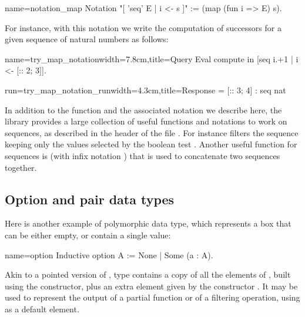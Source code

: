\begin{coq}{name=notation_map}{}
Notation "[ 'seq' E | i <- s ]" := (map (fun i => E) s).
\end{coq}
For instance, with this notation we write the computation of successors
for a given sequence of natural numbers as follows:

\begin{coq}{name=try_map_notation}{width=7.8cm,title=Query}
Eval compute in [seq i.+1 | i <- [:: 2; 3]].
\end{coq}
\begin{coqout}{run=try_map_notation_run}{width=4.3cm,title=Response}
= [:: 3; 4] : seq nat
\end{coqout}
\index[coq]{\C{[seq .. "| .. <- ..]}}
In addition to the function  and the associated notation
we describe here, the \mcbMC{} library
provides a large collection of useful functions and notations to work on
sequences, as described in the header of the file .  For
instance \C{[seq i <- s | p]} filters the sequence  keeping only
the values selected by the boolean test .
Another useful function for sequences is  (with infix notation \C{++})
that is used to concatenate two sequences together.
\index[coq]{\C{(_ ++ _)}}
\index[coq]{\C{[seq .. <- .. "| ..]}}

\subsection{Option and pair data types}\label{sec:othercontainers}

Here is another example of polymorphic data type, which represents a
box that can be either empty, or contain a single value:

\begin{coq}{name=option}{}
Inductive option A := None | Some (a : A).
\end{coq}

Akin to a pointed version of , type   contains a
copy of all the elements of ,
built using the  constructor, plus an extra element given by
the constructor . It may be used to represent the output of a
partial function or of a filtering operation, using  as a
default element.


